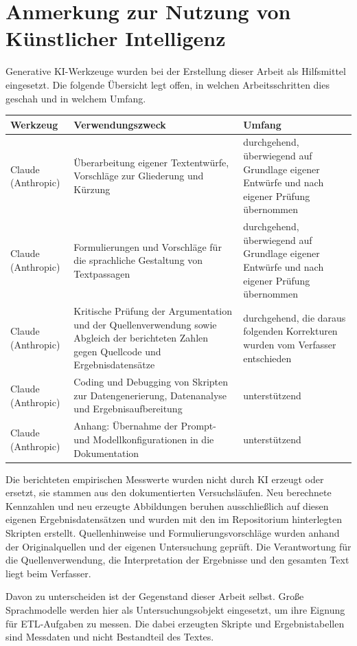
\chapter*{Anmerkung zur Nutzung von Künstlicher Intelligenz}

Generative KI-Werkzeuge wurden bei der Erstellung dieser Arbeit als Hilfsmittel
eingesetzt. Die folgende Übersicht legt offen, in welchen Arbeitsschritten dies
geschah und in welchem Umfang.

\vspace{1em}

\begin{tabularx}{\textwidth}{@{}p{3.2cm}XX@{}}
    \toprule
    \textbf{Werkzeug} & \textbf{Verwendungszweck} & \textbf{Umfang} \\
    \midrule
    Claude (Anthropic) & Überarbeitung eigener Textentwürfe, Vorschläge zur
    Gliederung und Kürzung &
    durchgehend, überwiegend auf Grundlage eigener Entwürfe und nach eigener Prüfung
    übernommen \\
    \addlinespace
    Claude (Anthropic) & Formulierungen und Vorschläge für die sprachliche Gestaltung von Textpassagen & durchgehend, überwiegend auf Grundlage eigener Entwürfe und nach eigener Prüfung übernommen \\
    \addlinespace
    Claude (Anthropic) & Kritische Prüfung der Argumentation und der
    Quellenverwendung sowie Abgleich der berichteten Zahlen gegen Quellcode
    und Ergebnisdatensätze & durchgehend, die daraus folgenden Korrekturen
    wurden vom Verfasser entschieden \\
    \addlinespace
    Claude (Anthropic) & Coding und Debugging von Skripten zur Datengenerierung, Datenanalyse und Ergebnisaufbereitung & unterstützend \\
    \addlinespace
    Claude (Anthropic) & Anhang: Übernahme der Prompt- und Modellkonfigurationen in die Dokumentation & unterstützend \\
    \bottomrule
\end{tabularx}

\vspace{1.5em}

Die berichteten empirischen Messwerte wurden nicht durch KI erzeugt oder ersetzt, sie stammen aus den dokumentierten Versuchsläufen. Neu berechnete Kennzahlen und neu erzeugte Abbildungen beruhen ausschließlich auf diesen eigenen Ergebnisdatensätzen und wurden mit den im Repositorium hinterlegten Skripten erstellt. Quellenhinweise und Formulierungsvorschläge wurden anhand der Originalquellen und der eigenen Untersuchung geprüft. Die Verantwortung für die Quellenverwendung, die Interpretation der Ergebnisse und den gesamten Text liegt beim Verfasser.

Davon zu unterscheiden ist der Gegenstand dieser Arbeit selbst. Große
Sprachmodelle werden hier als Untersuchungsobjekt eingesetzt, um ihre Eignung
für \ac{ETL}-Aufgaben zu messen. Die dabei erzeugten Skripte und Ergebnistabellen
sind Messdaten und nicht Bestandteil des Textes.
